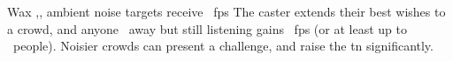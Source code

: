   {\mFate}%
  {Wax}%
  {\duplicated,\detailed,\distant}%
  {ambient noise}%
  {targets receive \rollConv~\glspl{fp}}%
  {
    The caster extends their best wishes to a crowd, and anyone \spellArea\ away but still listening gains \rollConv~\glspl{fp} (or at least up to \spellArea\ people).
    Noisier crowds can present a challenge, and raise the \gls{tn} significantly.
  }

